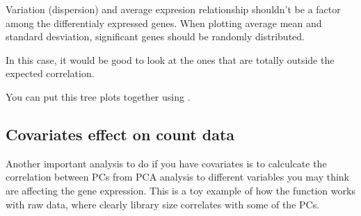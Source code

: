 \documentclass{article}
\begin{document}
Variation (dispersion) and average expresion relationship shouldn't be a factor among
the differentialy expressed genes. When plotting average mean and standard desviation,
significant genes should be randomly distributed.

In this case, it would be good to look at the ones that are totally outside the expected 
correlation.

You can put this tree plots together using .

\begin{knitrout}
\color{fgcolor}\begin{kframe}
\begin{alltt}
\hlstd{(res[[}\hlstd{]], counts, design[[}\hlstd{]])}
\end{alltt}
\end{kframe}
\end{knitrout}


\subsection{Covariates effect on count data}

Another important analysis to do if you have covariates is to calculcate
the correlation between PCs from PCA analysis to different variables you may
think are affecting the gene expression. This is a toy example of how the
function works with raw data, where clearly library size correlates with 
some of the PCs.
\end{document}
